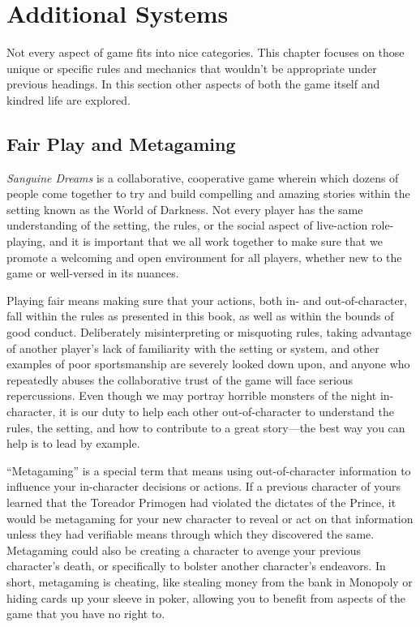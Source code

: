\section{Additional Systems}
\label{sec:additional}
Not every aspect of game fits into nice categories.  This chapter focuses 
on those unique or specific rules and mechanics that wouldn't be appropriate 
under previous headings.  In this section other aspects of both the game itself 
and kindred life are explored.

\subsection{Fair Play and Metagaming}
\emph{Sanguine Dreams} is a collaborative, cooperative game wherein which dozens of people come together 
to try and build compelling and amazing stories within the setting known as the World of Darkness.  Not 
every player has the same understanding of the setting, the rules, or the social aspect of live-action 
role-playing, and it is important that we all work together to make sure that we promote a welcoming and 
open environment for all players, whether new to the game or well-versed in its nuances.

Playing fair means making sure that your actions, both in- and out-of-character, fall within the rules as 
presented in this book, as well as within the bounds of good conduct.  Deliberately misinterpreting or 
misquoting rules, taking advantage of another player's lack of familiarity with the setting or system, 
and other examples of poor sportsmanship are severely looked down upon, and anyone who repeatedly abuses 
the collaborative trust of the game will face serious repercussions.  Even though we may portray horrible 
monsters of the night in-character, it is our duty to help each other out-of-character to understand the rules, 
the setting, and how to contribute to a great story---the best way you can help is to lead by example.

``Metagaming'' is a special term that means using out-of-character information to influence your in-character 
decisions or actions.  If a previous character of yours learned that the Toreador Primogen had violated the 
dictates of the Prince, it would be metagaming for your new character to reveal or act on that information 
unless they had verifiable means through which they discovered the same.  Metagaming could also be creating a 
character to avenge your previous character's death, or specifically to bolster another character's endeavors.  
In short, metagaming is cheating, like stealing money from the bank in Monopoly or hiding cards up your sleeve 
in poker, allowing you to benefit from aspects of the game that you have no right to.

